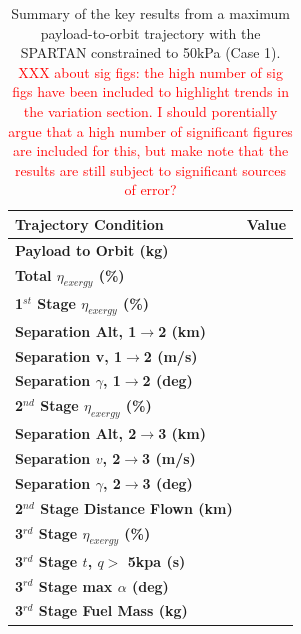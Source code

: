 \begin{table}[ht]
	\centering
	
	\begin{tabular}{l c } 
		\hline \textbf{Trajectory Condition}
		&Value
		\\
		\hline \textbf{Payload to Orbit (kg)}
		& \textbf{\PayloadToOrbitConstqNoReturn}
		\\
		\textbf{Total $\eta_{exergy}$ (\%)}
		& \textbf{\totalExergyEffConstqNoReturn}
		\\
		\hline 
		\textbf{1$^{st}$ Stage $\eta_{exergy}$ (\%)}
		& \textbf{\firstExergyEffConstqNoReturn}
		\\
	
		\textbf{Separation Alt, 1$\rightarrow$2 (km)}
		& \firstsecondSeparationAltConstqNoReturn
		\\
		\textbf{Separation v, 1$\rightarrow$2 (m/s)}
		& \firstsecondSeparationvConstqNoReturn
		\\
		\textbf{Separation $\gamma$, 1$\rightarrow$2 (deg)}
		& \firstsecondSeparationgammaConstqNoReturn
		\\
		\hline 
		\textbf{2$^{nd}$ Stage $\eta_{exergy}$ (\%)}
		& \textbf{\secondExergyEffConstqNoReturn}
		\\
		\textbf{Separation Alt, 2$\rightarrow$3 (km)}
		& \secondthirdSeparationAltConstqNoReturn
		\\
		\textbf{Separation $v$, 2$\rightarrow$3 (m/s)}
		& \secondthirdSeparationvConstqNoReturn
		\\
		\textbf{Separation $\gamma$, 2$\rightarrow$3 (deg)}
		& \secondthirdSeparationgammaConstqNoReturn
		\\
		\textbf{2$^{nd}$ Stage Distance Flown (km)}
		& \SecondDistConstqNoReturn
		\\
		\hline 
		\textbf{3$^{rd}$ Stage $\eta_{exergy}$ (\%)}
		& \textbf{\thirddExergyEffConstqNoReturn}
		\\
	
		\textbf{3$^{rd}$ Stage $t$, $q >$ 5kpa (s)}
		& \thirdqOverFiveConstqNoReturn
		\\
		\textbf{3$^{rd}$ Stage max $\alpha$ (deg)}
		& \thirdmaxAoAConstqNoReturn
		\\
		\textbf{3$^{rd}$ Stage Fuel Mass (kg)}
		& \thirdmFuelConstqNoReturn
		\\
		\hline 
	\end{tabular} 
	
	\caption{Summary of the key results from a maximum payload-to-orbit trajectory with the SPARTAN constrained to 50kPa (Case 1). \textcolor{red}{XXX about sig figs: the high number of sig figs have been included to highlight trends in the variation section. I should porentially argue that a high number of significant figures are included for this, but make note that the results are still subject to significant sources of error? }}
	\label{tab:constqsummary}
\end{table}
